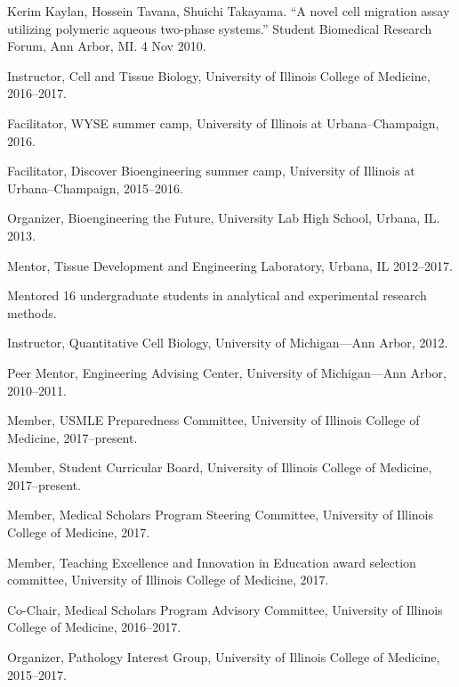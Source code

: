 \documentclass[11pt,article,oneside]{memoir}
\begin{document}
\ind Kerim Kaylan, Hossein Tavana, Shuichi Takayama. ``A novel cell migration assay utilizing polymeric aqueous two-phase systems.'' Student Biomedical Research Forum, Ann Arbor, MI. 4 Nov 2010.


\ind Instructor, Cell and Tissue Biology, University of Illinois College of Medicine, 2016--2017.

\ind Facilitator, WYSE summer camp, University of Illinois at Urbana--Champaign, 2016.

\ind Facilitator, Discover Bioengineering summer camp, University of Illinois at Urbana--Champaign, 2015--2016.

\ind Organizer, Bioengineering the Future, University Lab High School, Urbana, IL. 2013.

\ind Mentor, Tissue Development and Engineering Laboratory, Urbana, IL 2012--2017.

\ind \hspace{0.35in} \footnotesize Mentored 16 undergraduate students in analytical and experimental research methods. \normalsize\vspace{0.05in}

\ind Instructor, Quantitative Cell Biology, University of Michigan---Ann Arbor, 2012.

\ind Peer Mentor, Engineering Advising Center, University of Michigan---Ann Arbor, 2010--2011.

\bigskip


\ind Member, USMLE Preparedness Committee, University of Illinois College of Medicine, 2017--present.

\ind Member, Student Curricular Board, University of Illinois College of Medicine, 2017--present.

\ind Member, Medical Scholars Program Steering Committee, University of Illinois College of Medicine, 2017.

\ind Member, Teaching Excellence and Innovation in Education award selection committee, University of Illinois College of Medicine, 2017.

\ind Co-Chair, Medical Scholars Program Advisory Committee, University of Illinois College of Medicine, 2016--2017.

\ind Organizer, Pathology Interest Group, University of Illinois College of Medicine, 2015--2017.
\end{document}
